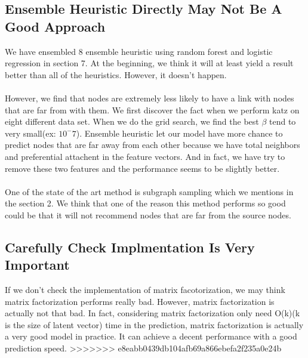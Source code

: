 \documentclass[12pt]{article}
\begin{document}
\subsection{Ensemble Heuristic Directly May Not Be A Good Approach}
We have ensembled 8 ensemble heuristic using random forest and logistic regression in section 7. At the beginning, we think it will at least yield a result better than all of the heuristics. However, it doesn't happen. 
\\ \\
However, we find that nodes are extremely less likely to have a link with nodes that are far from with them. We first discover the fact when we perform katz on eight different data set. When we do the grid search, we find the best $\beta$ tend to very small(ex: $10^-7$). Ensemble heuristic let our model have more chance to predict nodes that are far away from each other because we have total neighbors and preferential attachent in the feature vectors. And in fact, we have try to remove these two features and the performance seems to be slightly better.  
\\ \\
One of the state of the art method is subgraph sampling which we mentions in the section 2. We think that one of the reason this method performs so good could be that it will not recommend nodes that are far from the source nodes. 
\subsection{Carefully Check Implmentation Is Very Important}
If we don't check the implementation of matrix facotorization, we may think matrix factorization performs really bad. However, matrix factorization is actually not that bad. In fact, considering matrix factorization only need O(k)(k is the size of latent vector) time in the prediction, matrix factorization is actually a very good model in practice. It can achieve a decent performance with a good prediction speed.
>>>>>>> e8eabb0439db104afb69a866ebefa2f235a0e24b




	
\end{document}
